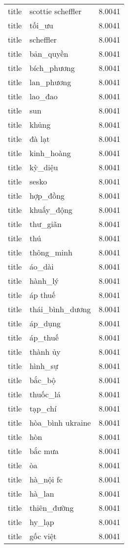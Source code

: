 \documentclass{article}
\begin{document}
\begin{tabular}{lll}
title & scottie scheffler & 8.0041\\
title & tối\_ưu & 8.0041\\
title & scheffler & 8.0041\\
title & bản\_quyền & 8.0041\\
title & bích\_phương & 8.0041\\
title & lan\_phương & 8.0041\\
title & lao\_đao & 8.0041\\
title & sun & 8.0041\\
title & khủng & 8.0041\\
title & đà lạt & 8.0041\\
title & kinh\_hoàng & 8.0041\\
title & kỳ\_diệu & 8.0041\\
title & sesko & 8.0041\\
title & hợp\_đồng & 8.0041\\
title & khuấy\_động & 8.0041\\
title & thư\_giãn & 8.0041\\
title & thú & 8.0041\\
title & thông\_minh & 8.0041\\
title & áo\_dài & 8.0041\\
title & hành\_lý & 8.0041\\
title & áp thuế & 8.0041\\
title & thái\_bình\_dương & 8.0041\\
title & áp\_dụng & 8.0041\\
title & áp\_thuế & 8.0041\\
title & thành ủy & 8.0041\\
title & hình\_sự & 8.0041\\
title & bắc\_bộ & 8.0041\\
title & thuốc\_lá & 8.0041\\
title & tạp\_chí & 8.0041\\
title & hòa\_bình ukraine & 8.0041\\
title & hòn & 8.0041\\
title & bắc mưa & 8.0041\\
title & òa & 8.0041\\
title & hà\_nội fc & 8.0041\\
title & hà\_lan & 8.0041\\
title & thiên\_đường & 8.0041\\
title & hy\_lạp & 8.0041\\
title & gốc việt & 8.0041\\

\end{tabular}
\end{document}
